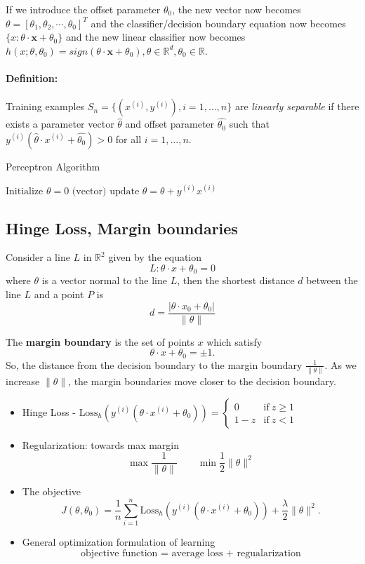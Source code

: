 \documentclass{article}
\begin{document}
If we introduce the offset parameter $\theta_0$, the new vector now becomes $\theta=[\theta_1, \theta_2,\cdots, \theta_0]^T$ and the classifier/decision boundary equation now becomes $\{x:\theta\cdot\textbf{x}+\theta_0\}$ and the new linear classifier now becomes $h(x;\theta,\theta_0)=sign(\theta\cdot\textbf{x}+\theta_0), \theta\in\mathbb{R}^d, \theta_0\in\mathbb{R}$.

\paragraph{Definition:} Training examples $S_n=\{\left(x^{(i)},y^{(i)}\right),i=1,\ldots,n\}$ are \textit{linearly separable} if there exists a parameter vector $\hat{\theta}$ and offset parameter $\hat{\theta_0}$ such that $y^{(i)}\left(\hat{\theta}\cdot x^{(i)}+\hat{\theta_0}\right)>0$ for all $i=1,\ldots,n$.


\begin{algorithm}
\caption{Perceptron Algorithm}
\begin{algorithmic}
\State $\text{Initialize }\theta=0\text{ (vector)}$
\State $\text{update }\theta=\theta+y^{(i)}x^{(i)}$
\EndIf
\EndFor
\EndFor
\EndProcedure
\end{algorithmic}
\end{algorithm}

\subsection{Hinge Loss, Margin boundaries}
Consider a line $L$ in $\mathbb{R}^2$ given by the equation $$L:\theta\cdot x+\theta_0=0$$ where $\theta$ is a vector normal to the line $L$, then the shortest distance $d$ between the line $L$ and a point $P$ is $$d=\frac{|\theta\cdot x_0+\theta_0|}{\lVert\theta\rVert}$$

The \textbf{margin boundary} is the set of points $x$ which satisfy $$\theta\cdot x+\theta_0=\pm 1.$$ So, the distance from the decision boundary to the margin boundary $\frac{1}{\lVert\theta\rVert}$. As we increase $\lVert\theta\rVert$, the margin boundaries move closer to the decision boundary.


\begin{itemize}
\item Hinge Loss - $\text{Loss}_h\left(y^{(i)}(\theta\cdot x^{(i)}+\theta_0)\right)=\begin{cases}0&\text{if}\ z\geq 1\\ 1-z&\text{if}\ z<1\end{cases}$
\item Regularization: towards max margin $$\max\frac{1}{\lVert\theta\rVert}\qquad\min\frac{1}{2}\lVert\theta\rVert^2$$
\item The objective $$J(\theta,\theta_0)=\frac{1}{n}\sum\limits_{i=1}^n\text{Loss}_h\left(y^{(i)}(\theta\cdot x^{(i)}+\theta_0)\right)+\frac{\lambda}{2}\lVert\theta\rVert^2.$$
\item General optimization formulation of learning $$\text{objective function = average loss + regualarization}$$
\end{itemize}
\end{document}
